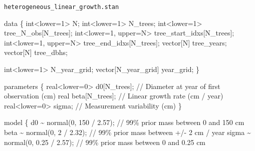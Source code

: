 \documentclass[
  letterpaper,
  DIV=11,
  numbers=noendperiod]{scrartcl}
\newenvironment{Shaded}{\begin{snugshade}}{\end{snugshade}}
\newcommand{\CommentTok}[1]{\textcolor[rgb]{0.37,0.37,0.37}{#1}}
\newcommand{\DataTypeTok}[1]{\textcolor[rgb]{0.68,0.00,0.00}{#1}}
\newcommand{\DecValTok}[1]{\textcolor[rgb]{0.68,0.00,0.00}{#1}}
\newcommand{\FloatTok}[1]{\textcolor[rgb]{0.68,0.00,0.00}{#1}}
\newcommand{\KeywordTok}[1]{\textcolor[rgb]{0.00,0.23,0.31}{#1}}
\newcommand{\NormalTok}[1]{\textcolor[rgb]{0.00,0.23,0.31}{#1}}
\begin{document}
\begin{codelisting}

\caption{\texttt{heterogeneous\_linear\_growth.stan}}

\begin{Shaded}
\begin{Highlighting}[]
\KeywordTok{data}\NormalTok{ \{}
  \DataTypeTok{int}\NormalTok{\textless{}}\KeywordTok{lower}\NormalTok{=}\DecValTok{1}\NormalTok{\textgreater{} N;}
  \DataTypeTok{int}\NormalTok{\textless{}}\KeywordTok{lower}\NormalTok{=}\DecValTok{1}\NormalTok{\textgreater{} N\_trees;}
  \DataTypeTok{int}\NormalTok{\textless{}}\KeywordTok{lower}\NormalTok{=}\DecValTok{1}\NormalTok{\textgreater{} tree\_N\_obs[N\_trees];}
  \DataTypeTok{int}\NormalTok{\textless{}}\KeywordTok{lower}\NormalTok{=}\DecValTok{1}\NormalTok{, }\KeywordTok{upper}\NormalTok{=N\textgreater{} tree\_start\_idxs[N\_trees];}
  \DataTypeTok{int}\NormalTok{\textless{}}\KeywordTok{lower}\NormalTok{=}\DecValTok{1}\NormalTok{, }\KeywordTok{upper}\NormalTok{=N\textgreater{} tree\_end\_idxs[N\_trees];}
  \DataTypeTok{vector}\NormalTok{[N] tree\_years;}
  \DataTypeTok{vector}\NormalTok{[N] tree\_dbhs;}
  
  \DataTypeTok{int}\NormalTok{\textless{}}\KeywordTok{lower}\NormalTok{=}\DecValTok{1}\NormalTok{\textgreater{} N\_year\_grid;}
  \DataTypeTok{vector}\NormalTok{[N\_year\_grid] year\_grid;}
\NormalTok{\}}

\KeywordTok{parameters}\NormalTok{ \{}
  \DataTypeTok{real}\NormalTok{\textless{}}\KeywordTok{lower}\NormalTok{=}\DecValTok{0}\NormalTok{\textgreater{} d0[N\_trees]; }\CommentTok{// Diameter at year of first observation (cm)}
  \DataTypeTok{real}\NormalTok{ beta[N\_trees];        }\CommentTok{// Linear growth rate (cm / year)}
  \DataTypeTok{real}\NormalTok{\textless{}}\KeywordTok{lower}\NormalTok{=}\DecValTok{0}\NormalTok{\textgreater{} sigma;       }\CommentTok{// Measurement variability (cm)}
\NormalTok{\}}

\KeywordTok{model}\NormalTok{ \{}
\NormalTok{  d0 \textasciitilde{} normal(}\DecValTok{0}\NormalTok{, }\DecValTok{150}\NormalTok{ / }\FloatTok{2.57}\NormalTok{);     }\CommentTok{// 99\% prior mass between 0 and 150 cm}
\NormalTok{  beta \textasciitilde{} normal(}\DecValTok{0}\NormalTok{, }\DecValTok{2}\NormalTok{ / }\FloatTok{2.32}\NormalTok{);     }\CommentTok{// 99\% prior mass between +/{-} 2 cm / year}
\NormalTok{  sigma \textasciitilde{} normal(}\DecValTok{0}\NormalTok{, }\FloatTok{0.25}\NormalTok{ / }\FloatTok{2.57}\NormalTok{); }\CommentTok{// 99\% prior mass between 0 and 0.25 cm }
  

\end{Highlighting}
\end{Shaded}
\end{codelisting}
\end{document}
